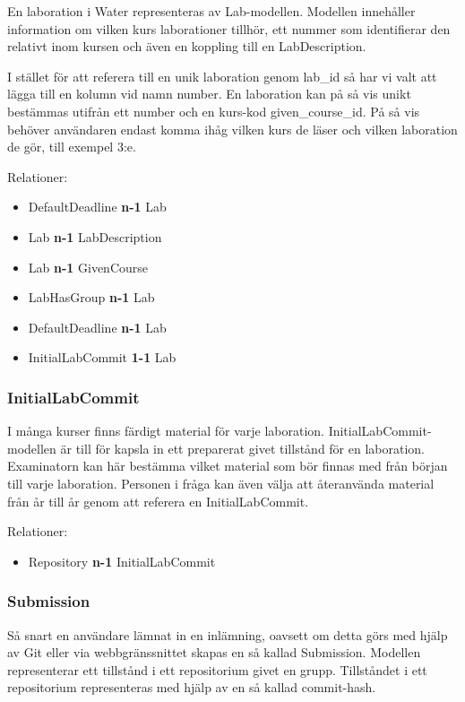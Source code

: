En laboration i Water representeras av Lab-modellen. Modellen innehåller information om vilken kurs laborationer tillhör, ett nummer som identifierar den relativt inom kursen och även en koppling till en LabDescription.

I stället för att referera till en unik laboration genom lab\_id så har vi valt att lägga till en kolumn vid namn number. En laboration kan på så vis unikt bestämmas utifrån ett number och en kurs-kod given\_course\_id. På så vis behöver användaren endast komma ihåg vilken kurs de läser och vilken laboration de gör, till exempel 3:e.

Relationer: 
\begin{itemize}
  \item DefaultDeadline {\bf n-1} Lab
  \item Lab {\bf n-1} LabDescription
  \item Lab {\bf n-1} GivenCourse
  \item LabHasGroup {\bf n-1} Lab
  \item DefaultDeadline {\bf n-1} Lab
  \item InitialLabCommit {\bf 1-1} Lab
\end{itemize}

\subsubsection{InitialLabCommit}
I många kurser finns färdigt material för varje laboration. InitialLabCommit-modellen är till för kapsla in ett preparerat givet tillstånd för en laboration. Examinatorn kan här bestämma vilket material som bör finnas med från början till varje laboration. Personen i fråga kan även välja att återanvända material från år till år genom att referera en InitialLabCommit.

Relationer: 
\begin{itemize}
  \item Repository {\bf n-1} InitialLabCommit 
\end{itemize}

\subsubsection{Submission}
Så snart en användare lämnat in en inlämning, oavsett om detta görs med hjälp av Git eller via webbgränssnittet skapas en så kallad Submission. Modellen representerar ett tillstånd i ett repositorium givet en grupp. Tillståndet i ett repositorium representeras med hjälp av en så kallad commit-hash.

